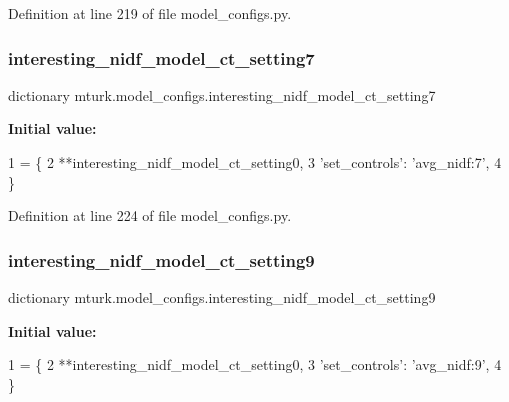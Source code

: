 Definition at line 219 of file model\+\_\+configs.\+py.

\mbox{\label{namespacemturk_1_1model__configs_aefaf61e336a323ef4ae389dbd5f2426e}} 
\subsubsection{\texorpdfstring{interesting\+\_\+nidf\+\_\+model\+\_\+ct\+\_\+setting7}{interesting\_nidf\_model\_ct\_setting7}}
{\footnotesize\ttfamily dictionary mturk.\+model\+\_\+configs.\+interesting\+\_\+nidf\+\_\+model\+\_\+ct\+\_\+setting7}

{\bfseries Initial value\+:}
\begin{DoxyCode}
1 =  \{
2     **interesting\_nidf\_model\_ct\_setting0,
3     \textcolor{stringliteral}{'set\_controls'}: \textcolor{stringliteral}{'avg\_nidf:7'},
4 \}
\end{DoxyCode}


Definition at line 224 of file model\+\_\+configs.\+py.

\mbox{\label{namespacemturk_1_1model__configs_a5064140f9f584dcc902a9840c915950c}} 
\subsubsection{\texorpdfstring{interesting\+\_\+nidf\+\_\+model\+\_\+ct\+\_\+setting9}{interesting\_nidf\_model\_ct\_setting9}}
{\footnotesize\ttfamily dictionary mturk.\+model\+\_\+configs.\+interesting\+\_\+nidf\+\_\+model\+\_\+ct\+\_\+setting9}

{\bfseries Initial value\+:}
\begin{DoxyCode}
1 =  \{
2     **interesting\_nidf\_model\_ct\_setting0,
3     \textcolor{stringliteral}{'set\_controls'}: \textcolor{stringliteral}{'avg\_nidf:9'},
4 \}
\end{DoxyCode}


